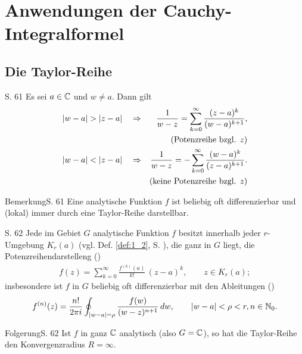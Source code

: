 \section{Anwendungen der Cauchy-Integralformel}



\subsection{Die Taylor-Reihe}

\begin{satz}{S. 61}
  Es sei $a \in \mathbb{C}$ und $w \neq a$.
  Dann gilt
  \begin{align}
    |w - a| > |z - a| \quad & \Rightarrow &\frac{1}{w-z} = \sum_{k=0}^\infty \frac{(z-a)^k}{(w-a)^{k+1}} , \\
    && (\text{Potenzreihe bzgl. } z) \notag \\
    |w - a| < |z - a| \quad & \Rightarrow &\frac{1}{w-z} = - \sum_{k=0}^\infty \frac{(w-a)^k}{(z-a)^{k+1}} . \\
    && (\text{keine Potenzreihe bzgl. } z) \notag
  \end{align}
\end{satz}

\begin{bemerkung}{Bemerkung}{S. 61}
  Eine analytische Funktion $f$ ist beliebig oft differenzierbar und (lokal) immer durch eine Taylor-Reihe darstellbar.
\end{bemerkung}

\begin{satz}{S. 62}
  \label{satz:6_2}
  Jede im Gebiet $G$ analytische Funktion $f$ besitzt innerhalb jeder $r$-Um\-ge\-bung $K_r(a)$ (vgl. Def. \ref{def:1_2}, S. \pageref{def:1_2}), die ganz in $G$ liegt, die Potenzreihendarstelleng ()
  \begin{align}
    f(z) = \sum_{k=0}^\infty \frac{f^{(k)}(a)}{k!} \, (z - a)^k, \qquad z \in K_r(a);
  \end{align}
  insbesondere ist $f$ in $G$ beliebig oft differenzierbar mit den Ableitungen ()
  \begin{align}
    f^{(n)}(z) =  \frac{n!}{2 \pi i} \oint_{|w-a|=\rho} \frac{f(w)}{(w-z)^{n+1}} \, dw, \qquad |w-a| < \rho < r, n \in \mathbb{N}_0 .
  \end{align}
\end{satz}

\begin{bemerkung}{Folgerung}{S. 62}
  Ist $f$ in ganz $\mathbb{C}$ analytisch (also $G = \mathbb{C}$), so hat die Taylor-Reihe den Konvergenzradius $R = \infty$.
\end{bemerkung}

